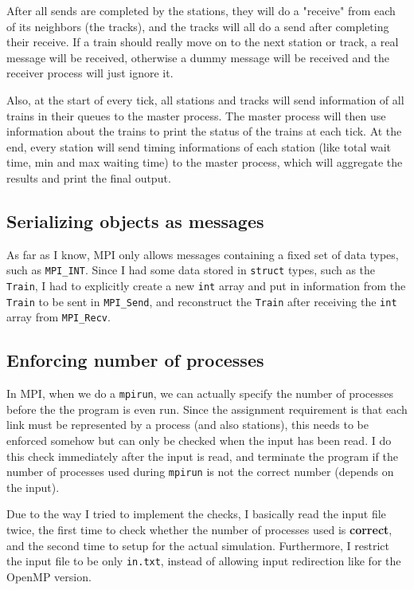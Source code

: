 \documentclass[12pt]{article}
\begin{document}
\bigbreak \noindent After all sends are completed by the stations, they will do a "receive" from each of its neighbors (the tracks), and the tracks will all do a send after completing their receive. If a train should really move on to the next station or track, a real message will be received, otherwise a dummy message will be received and the receiver process will just ignore it.

\bigbreak \noindent Also, at the start of every tick, all stations and tracks will send information of all trains in their queues to the master process. The master process will then use information about the trains to print the status of the trains at each tick. At the end, every station will send timing informations of each station (like total wait time, min and max waiting time) to the master process, which will aggregate the results and print the final output.

\subsection{Serializing objects as messages}

As far as I know, MPI only allows messages containing a fixed set of data types, such as \verb!MPI_INT!. Since I had some data stored in \verb!struct! types, such as the \verb!Train!, I had to explicitly create a new \verb!int! array and put in information from the \verb!Train! to be sent in \verb!MPI_Send!, and reconstruct the \verb!Train! after receiving the \verb!int! array from \verb!MPI_Recv!.

\subsection{Enforcing number of processes}
In MPI, when we do a \verb!mpirun!, we can actually specify the number of processes before the the program is even run. Since the assignment requirement is that each link must be represented by a process (and also stations), this needs to be enforced somehow but can only be checked when the input has been read. I do this check immediately after the input is read, and terminate the program if the number of processes used during \verb!mpirun! is not the correct number (depends on the input).

Due to the way I tried to implement the checks, I basically read the input file twice, the first time to check whether the number of processes used is \textbf{correct}, and the second time to setup for the actual simulation. Furthermore, I restrict the input file to be only \verb!in.txt!, instead of allowing input redirection like for the OpenMP version.
\end{document}
